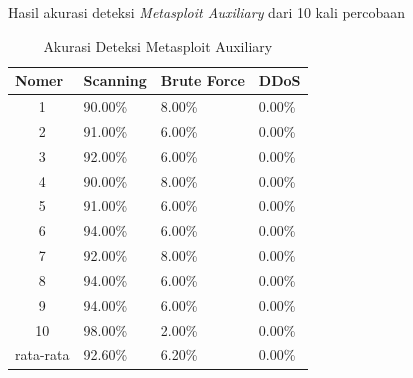 Hasil akurasi deteksi \emph{Metasploit Auxiliary} dari 10 kali percobaan
\begin{table}[H]
	\centering
	\caption{Akurasi Deteksi Metasploit Auxiliary}
	\label{Akurasi Deteksi Metasploit Auxiliary}
	\begin{tabular}{|c|l|l|l|}
		\hline
		\multicolumn{1}{|l|}{Nomer}     & Scanning & Brute Force & DDoS   \\ \hline
		1                               & 90.00\%  & 8.00\%      & 0.00\% \\ \hline
		2                               & 91.00\%  & 6.00\%      & 0.00\% \\ \hline
		3                               & 92.00\%  & 6.00\%      & 0.00\% \\ \hline
		4                               & 90.00\%  & 8.00\%      & 0.00\% \\ \hline
		5                               & 91.00\%  & 6.00\%      & 0.00\% \\ \hline
		6                               & 94.00\%  & 6.00\%      & 0.00\% \\ \hline
		7                               & 92.00\%  & 8.00\%      & 0.00\% \\ \hline
		8                               & 94.00\%  & 6.00\%      & 0.00\% \\ \hline
		9                               & 94.00\%  & 6.00\%      & 0.00\% \\ \hline
		10                              & 98.00\%  & 2.00\%      & 0.00\% \\ \hline
		\multicolumn{1}{|l|}{rata-rata} & 92.60\%  & 6.20\%      & 0.00\% \\ \hline
	\end{tabular}
\end{table}

